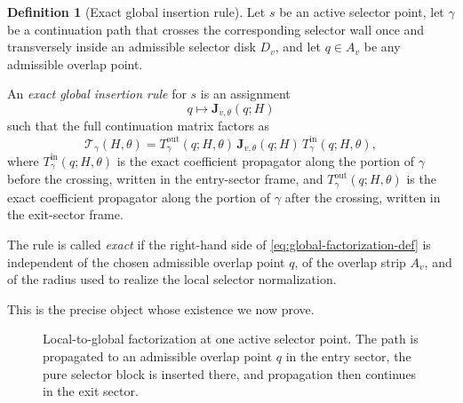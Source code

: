 \documentclass[11pt]{article}
\numberwithin{equation}{section}
\theoremstyle{definition}
\newtheorem{definition}[theorem]{Definition}
\newcommand{\wall}{\mathcal W}
\newcommand{\Jemb}{\mathbf J_{v,\theta}}
\newcommand{\Tin}{T^{\mathrm{in}}_{\gamma}}
\newcommand{\Tout}{T^{\mathrm{out}}_{\gamma}}
\newcommand{\Tfun}{\mathcal T}
\begin{document}
\begin{definition}[Exact global insertion rule]
\label{def:global-insertion-rule}
Let $s$ be an active selector point, let $\gamma$ be a continuation path that crosses the corresponding selector wall once and transversely inside an admissible selector disk $D_v$, and let $q\in A_v$ be any admissible overlap point.

An \emph{exact global insertion rule} for $s$ is an assignment
\begin{equation}
\label{eq:insertion-assignment}
 q\longmapsto \Jemb(q;H)
\end{equation}
such that the full continuation matrix factors as
\begin{equation}
\label{eq:global-factorization-def}
 \Tfun_\gamma(H,\theta)=\Tout(q;H,\theta)\,\Jemb(q;H)\,\Tin(q;H,\theta),
\end{equation}
where $\Tin(q;H,\theta)$ is the exact coefficient propagator along the portion of $\gamma$ before the crossing, written in the entry-sector frame, and $\Tout(q;H,\theta)$ is the exact coefficient propagator along the portion of $\gamma$ after the crossing, written in the exit-sector frame.

The rule is called \emph{exact} if the right-hand side of \eqref{eq:global-factorization-def} is independent of the chosen admissible overlap point $q$, of the overlap strip $A_v$, and of the radius used to realize the local selector normalization.
\end{definition}

This is the precise object whose existence we now prove.

\begin{figure}[H]
\centering
{}
\caption{Local-to-global factorization at one active selector point. The path is propagated to an admissible overlap point $q$ in the entry sector, the pure selector block is inserted there, and propagation then continues in the exit sector.}
\end{figure}
\end{document}

